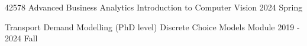 

\vspace{-1.ex}
\begin{cvteachings}
  \cvteaching
	{42578 Advanced Business Analytics} %
	{Introduction to Computer Vision} %
	{} %
	{2024 Spring} %
\end{cvteachings}


\vspace{-1.ex}
\begin{cvteachings}
  \cvteaching
	{Transport Demand Modelling (PhD level)} %
	{Discrete Choice Models Module} %
	{} %
	{2019 - 2024 Fall} %
\end{cvteachings}

